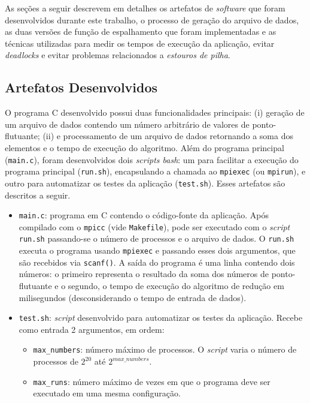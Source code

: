 \documentclass[12pt,a4paper]{article}
\begin{document}
As seções a seguir descrevem em detalhes os artefatos de \textit{software} que
foram desenvolvidos durante este trabalho, o processo de geração do arquivo de
dados, as duas versões de função de espalhamento que foram implementadas e as
técnicas utilizadas para medir os tempos de execução da aplicação, evitar
\textit{deadlocks} e evitar problemas relacionados a \emph{estouros de pilha}.

\subsection{Artefatos Desenvolvidos}
O programa C desenvolvido possui duas funcionalidades principais: (i) geração de
um arquivo de dados contendo um número arbitrário de valores de ponto-flutuante;
(ii) e processamento de um arquivo de dados retornando a soma dos elementos e o
tempo de execução do algoritmo. Além do programa principal (\texttt{main.c}),
foram desenvolvidos dois \textit{scripts bash}: um para facilitar a execução do
programa principal (\texttt{run.sh}), encapsulando a chamada ao \texttt{mpiexec}
(ou \texttt{mpirun}), e outro para automatizar os testes da aplicação
(\texttt{test.sh}). Esses artefatos são descritos a seguir.

\begin{itemize}
    \item \texttt{main.c}: programa em C contendo o código-fonte da aplicação.
        Após compilado com o \texttt{mpicc} (vide \texttt{Makefile}), pode ser
        executado com o \textit{script} \texttt{run.sh} passando-se o número de
        processos e o arquivo de dados. O \texttt{run.sh} executa o programa
        usando \texttt{mpiexec} e passando esses dois argumentos, que são
        recebidos via \texttt{scanf()}. A saída do programa é uma linha contendo
        dois números: o primeiro representa o resultado da soma dos números de
        ponto-flutuante e o segundo, o tempo de execução do algoritmo de redução
        em milisegundos (desconsiderando o tempo de entrada de dados).
	\item \texttt{test.sh}: \textit{script} desenvolvido para automatizar os
		testes da aplicação. Recebe como entrada 2 argumentos, em ordem:
		\begin{itemize}
			\item \texttt{max\_numbers}: número máximo de processos. O
				\textit{script} varia o número de processos de $2^{20}$ até
				$2^{max\_numbers}$.
			\item \texttt{max\_runs}: número máximo de vezes em que o programa
				deve ser executado em uma mesma configuração.
		\end{itemize}
\end{itemize}
\end{document}
